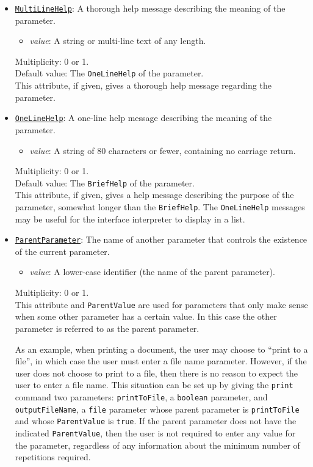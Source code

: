 \documentclass[11pt]{article}
\begin{document}
\begin{itemize}
\item \underline{\tt MultiLineHelp}:  A thorough help message
describing the meaning of the parameter.
\begin{itemize}
\item {\it value}: A string or multi-line text of any length.
\end{itemize}
Multiplicity: 0 or 1. \\
Default value: The {\tt OneLineHelp} of the parameter. \\
This attribute, if given, gives a thorough help message
regarding the parameter.

\item \underline{\tt OneLineHelp}:  A one-line help message describing
the meaning of the parameter.
\begin{itemize}
\item {\it value}: A string of 80 characters or fewer, containing
  no carriage return.
\end{itemize}
Multiplicity: 0 or 1. \\
Default value: The {\tt BriefHelp} of the parameter. \\
This attribute, if given, gives a help message describing the purpose of
the parameter, somewhat longer than the {\tt BriefHelp}.  The
{\tt OneLineHelp} messages may be useful for the interface interpreter to
display in a list.

\item \underline{\tt ParentParameter}:  The name of another parameter
that controls the existence of the current parameter.
\begin{itemize}
\item {\it value}:  A lower-case identifier (the name of the
  parent parameter).
\end{itemize}
Multiplicity: 0 or 1. \\
This attribute and {\tt ParentValue}
are used for parameters that only make sense when some other parameter
has a certain value.  In this case the other parameter is referred
to as the parent parameter.

As an example, when printing a document, the user may choose to
``print to a file'', in which case the user must enter a file name
parameter.  However, if the user does not choose to print to a
file, then there is no reason to expect the user to enter a
file name.  This situation can be set up by giving the
{\tt print} command two parameters:  {\tt printToFile},
a {\tt boolean} parameter, and
{\tt outputFileName}, a {\tt file} parameter
whose parent parameter is {\tt printToFile} and whose
{\tt ParentValue} is \verb/true/.
If the parent parameter does not have the indicated {\tt ParentValue},
then the user is not required to enter any value for the parameter,
regardless of any information about the minimum number of
repetitions required.


\end{itemize}
\end{document}
